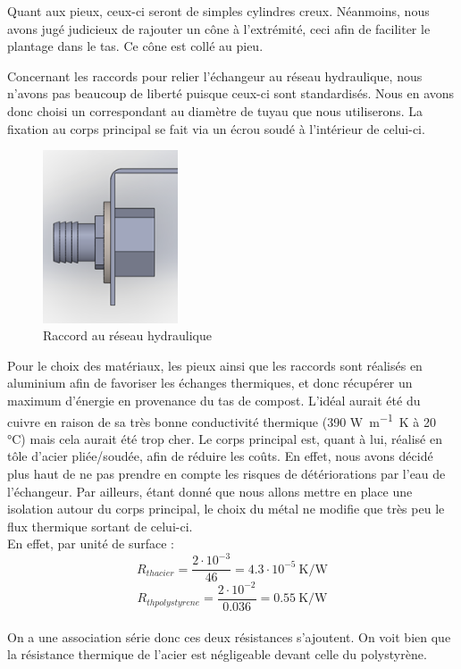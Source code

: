 \documentclass[../PS6_RapportFinal.tex]{subfiles}
\begin{document}
Quant aux pieux, ceux-ci seront de simples cylindres creux. Néanmoins, nous avons jugé judicieux de rajouter un cône à l'extrémité, ceci afin de faciliter le plantage dans le tas. Ce cône est collé au pieu.

Concernant les raccords pour relier l'échangeur au réseau hydraulique, nous n'avons pas beaucoup de liberté puisque ceux-ci sont standardisés. Nous en avons donc choisi un correspondant au diamètre de tuyau que nous utiliserons. La fixation au corps principal se fait via un écrou soudé à l'intérieur de celui-ci.  %

\begin{figure}[!h]
\begin{center}
\includegraphics[width=4cm]{3_1_Raccord_ES_1.png}
\caption{Raccord au réseau hydraulique}
\end{center}
\end{figure}


Pour  le choix des matériaux, les pieux ainsi que les raccords sont réalisés en aluminium afin de favoriser les échanges thermiques, et donc récupérer un maximum d'énergie en provenance du tas de compost. L'idéal aurait été du cuivre en raison de sa très bonne conductivité thermique (390 \si{\watt\per\metre\kelvin} à 20 \si{\degreeCelsius}) mais cela aurait été trop cher. Le corps principal est, quant à lui, réalisé en tôle d'acier pliée/soudée, afin de réduire les coûts. En effet, nous avons décidé plus haut de ne pas prendre en compte les risques de détériorations par l'eau de l'échangeur. Par ailleurs, étant donné que nous allons mettre en place une isolation autour du corps principal, le choix du métal ne modifie que très peu le flux thermique sortant de celui-ci.
\\
En effet, par unité de surface :
\\
\[R_{th acier} = \frac{2 \cdot 10^{-3}}{46}=\num{4.3} \cdot 10^{-5} \: \si{\kelvin\per\watt}\]
\[R_{th polystyrene} = \frac{2 \cdot 10^{-2}}{\num{0.036}}=\num{0.55} \: \si{\kelvin\per\watt}\]
\\
On a une association série donc ces deux résistances s'ajoutent. On voit bien que la résistance thermique de l'acier est négligeable devant celle du polystyrène.
\end{document}
